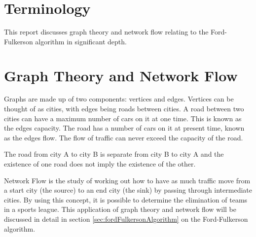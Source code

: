 \section{Terminology}

This report discusses graph theory and network flow relating to the
Ford-Fulkerson algorithm in significant depth.

\section{Graph Theory and Network Flow}

Graphs are made up of two components: vertices and edges. Vertices can be
thought of as cities, with edges being roads between cities. A road between
two cities can have a maximum number of cars on it at one time. This is
known as the edges capacity. The road has a number of cars on it at present
time, known as the edges flow. The flow of traffic can never exceed the
capacity of the road.

The road from city A to city B is separate from city B to city A and the
existence of one road does not imply the existence of the other.

Network Flow is the study of working out how to have as much traffic move
from a start city (the source) to an end city (the sink) by passing through 
intermediate cities. By using this concept, it is possible to determine
the elimination of teams in a sports league. This application of graph
theory and network flow will be discussed in detail in section
\ref{sec:fordFulkersonAlgorithm} on the Ford-Fulkerson algorithm.
